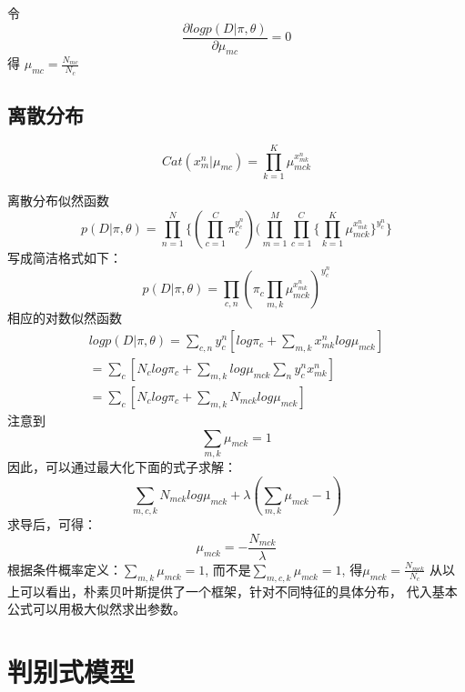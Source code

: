 令
\begin{equation}
\frac{\partial logp(D|\pi, \theta)} {\partial \mu_{mc}}
= 0
\end{equation}
得
$\mu_{mc} = \frac{N_{mc}}{N_c}$

\subsection{离散分布}
\begin{equation}
Cat(x_m^n|\mu_{mc}) = \prod_{k = 1}^K\mu_{mck}^{x_{mk}^n}
\end{equation}

离散分布似然函数
\begin{equation}
p(D|\pi, \theta) = \prod_{n=1}^N\{
(\prod_{c=1}^C\pi_c^{y_c^n})
(\prod_{m=1}^M\prod_{c=1}^C
\{\prod_{k = 1}^K\mu_{mck}^{x_{mk}^n}
\}^{y_{c}^n}
\}
\end{equation}
写成简洁格式如下：
\begin{equation}
p(D|\pi, \theta) = \prod_{c, n}
(\pi_c\prod_{m, k}\mu_{mck}^{x_{mk}^n})^{y_c^n}
\end{equation}
相应的对数似然函数
\begin{equation}
\begin{aligned}
logp(D|\pi, \theta) = \sum_{c, n}y_c^n[log\pi_c + \sum_{m, k}x_{mk}^nlog\mu_{mck}]
\\= \sum_c[N_clog\pi_c + \sum_{m, k}log\mu_{mck}\sum_ny_c^nx_{mk}^n]
\\=\sum_c[N_clog\pi_c + \sum_{m,k}N_{mck}log\mu_{mck}]
\end{aligned}
\end{equation}
注意到
\begin{equation}
\sum_{m,k} \mu_{mck} = 1
\end{equation}
因此，可以通过最大化下面的式子求解：
\begin{equation}
\sum_{m,c,k}N_{mck}log\mu_{mck} +\lambda(\sum_{m,k}\mu_{mck} -1)
\end{equation}
求导后，可得：
\begin{equation}
\mu_{mck} = -\frac{N_{mck}}{\lambda}
\end{equation}
根据条件概率定义：$\sum_{m,k}\mu_{mck} = 1$, 而不是$\sum_{m,c,k}\mu_{mck} = 1$, 
得$\mu_{mck} = \frac{N_{mck}} {N_c}$
从以上可以看出，朴素贝叶斯提供了一个框架，针对不同特征的具体分布，
代入基本公式可以用极大似然求出参数。

\section{判别式模型}

